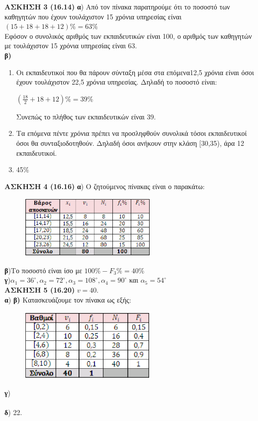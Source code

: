 \documentclass[11pt,a4paper]{article}
\begin{document}
\textbf{ ΑΣΚΗΣΗ 3 (16.14) }
\textbf{α}) Από τον πίνακα παρατηρούμε ότι το ποσοστό των καθηγητών που έχουν τουλάχιστον 15 χρόνια υπηρεσίας είναι $(15+18+18+12)\%=63\%$ \\
Εφόσον ο συνολικός αριθμός των εκπαιδευτικών είναι 100, ο αριθμός των καθηγητών με τουλάχιστον 15 χρόνια υπηρεσίας είναι 63.\\
\textbf{ β) }
\begin{enumerate}[i]\item Οι εκπαιδευτικοί που θα πάρουν σύνταξη μέσα στα επόμενα12,5 χρόνια είναι όσοι έχουν τουλάχιστον 22,5 χρόνια υπηρεσίας. Δηλαδή το ποσοστό είναι: \begin{center} $(\frac{18}{2}+18+12)\%=39\%$ \end{center}
Συνεπώς το πλήθος των εκπαιδευτικών είναι 39.
\item Τα επόμενα πέντε χρόνια πρέπει να προσληφθούν συνολικά τόσοι εκπαιδευτικοί όσοι θα συνταξιοδοτηθούν. Δηλαδή όσοι ανήκουν στην κλάση [30,35), άρα 12 εκπαιδευτικοί.
\item 45\%
\end{enumerate}

\newpage

\textbf{ ΑΣΚΗΣΗ 4 (16.16)   } 
\textbf{α}) Ο ζητούμενος πίνακας είναι ο παρακάτω:\\

\begin{figure}[hbtp]
\includegraphics[width=0.6\textwidth, scale=0.5]{A4.eps}
\end{figure}

\textbf{ β})Το ποσοστό είναι ίσο με $100\%-F_3\%=40\%$ \\

\textbf{γ})$α_1=36^{\circ}, α_2=72^{\circ},α_3=108^{\circ},α_4=90^{\circ}$ και $α_5=54^{\circ}$\\


\textbf{ ΑΣΚΗΣΗ 5 (16.20)   } $v=40.$\\
\textbf{α})
\textbf{ β)  }Κατασκευάζουμε τον πίνακα ως εξής:\\

\begin{figure}[hbtp]
\includegraphics[width=0.6\textwidth, scale=0.5]{A5.eps}
\end{figure}

\textbf{ γ})\\\\
\textbf{δ}) 22.\\
\end{document}
